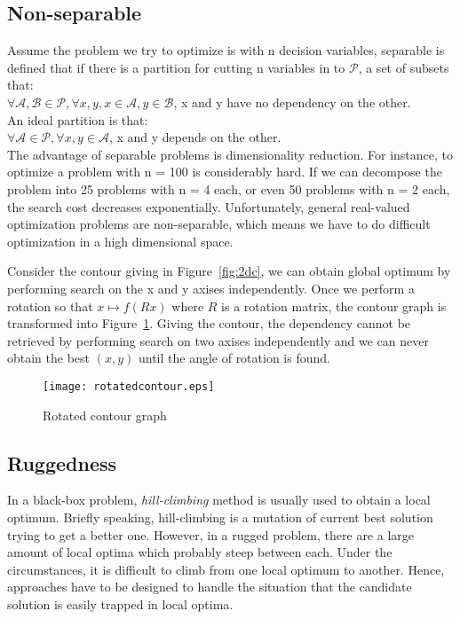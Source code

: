\subsection{Non-separable}

Assume the problem we try to optimize is with n decision variables, separable is defined that if there is a partition for cutting n variables in to $\mathcal{P}$, a set of subsets that:\\
$\forall \mathcal{A}, \mathcal{B} \in \mathcal{P}, \forall x, y, x \in \mathcal{A} , y \in \mathcal{B}$, x and y have no dependency on the other.\\
An ideal partition is that:\\
$\forall \mathcal{A} \in \mathcal{P}, \forall x, y \in \mathcal{A}$, x and y depends on the other.\\
The advantage of separable problems is dimensionality reduction.
For instance, to optimize a problem with n = 100 is considerably hard.
If we can decompose the problem into 25 problems with n = 4 each, or
even 50 problems with n = 2 each, the search cost decreases
exponentially.
Unfortunately, general real-valued optimization problems are
non-separable, which means we have to do difficult optimization in
a high dimensional space.

Consider the contour giving in Figure~\ref{fig:2dc}, we can obtain
global optimum by performing search on the x and y axises independently.
Once we perform a rotation so that $x \mapsto f(Rx)$ where $R$ is a
rotation matrix, the contour graph is transformed into
Figure~\ref{fig:2dcr}.
Giving the contour, the dependency cannot be retrieved by performing
search on two axises independently and we can never obtain the best
$(x,y)$ until the angle of rotation is found.
\begin{figure}
  \centering
  \texttt{[image: rotatedcontour.eps]}
  \caption{Rotated contour graph}
  \label{fig:2dcr}
\end{figure}


\subsection{Ruggedness}

In a black-box problem, \emph{hill-climbing} method is usually used to
obtain a local optimum.
Briefly speaking, hill-climbing is a mutation of current best solution
trying to get a better one.
However, in a rugged problem, there are a large amount of local optima
which probably steep between each.
Under the circumstances, it is difficult to climb from one local optimum to another.
Hence, approaches have to be designed to handle the situation that the
candidate solution is easily trapped in local optima.


